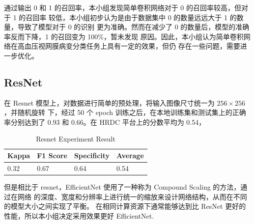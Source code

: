 \documentclass[UTF8,12pt,a4paper]{ctexart}
\begin{document}
通过输出 0 和 1 的召回率，本小组发现简单卷积网络对于 0 的召回率较高，但对于 1 的召回率
较低，本小组初步认为是由于数据集中 0 的数量远远大于 1 的数量，导致了模型对于 0 的识别
更为准确。然而在减少了 0 的数量后，模型的准确率反而下降，1 的召回变为 100\%，暂未发现
原因。因此，本小组认为简单卷积网络在高血压视网膜病变分类任务上具有一定的效果，但仍
存在一些问题，需要进一步优化。

\subsection{ResNet}
在 Resnet 模型上，对数据进行简单的预处理，将输入图像尺寸统一为 $256\times 256$，并随机旋转
下，经过 50 个 epoch 训练之后，在本地训练集和测试集上的正确率分别达到了 0.93 和 0.66。在 HRDC
平台上的分数平均为 0.54，
\begin{table}[H]
    \centering
    \begin{tabular}{|l|l|l|l|}
    \hline
        Kappa & F1 Score & Specificity & Average \\ \hline
        0.32 & 0.67 & 0.64 & 0.54 \\ \hline
    \end{tabular}
    \caption{Resnet Experiment Result}
    \label{Resnet Experiment Result}
\end{table}
但是相比于 resnet，EfficientNet 使用了一种称为 Compound Scaling 的方法，通过在网络
的深度、宽度和分辨率上进行统一的缩放来设计网络结构，从而在不同的模型大小之间实现了平衡。
在相同计算资源下通常能够达到比 ResNet 更好的性能，所以本小组决定采用效果更好 EfficientNet.
\end{document}
